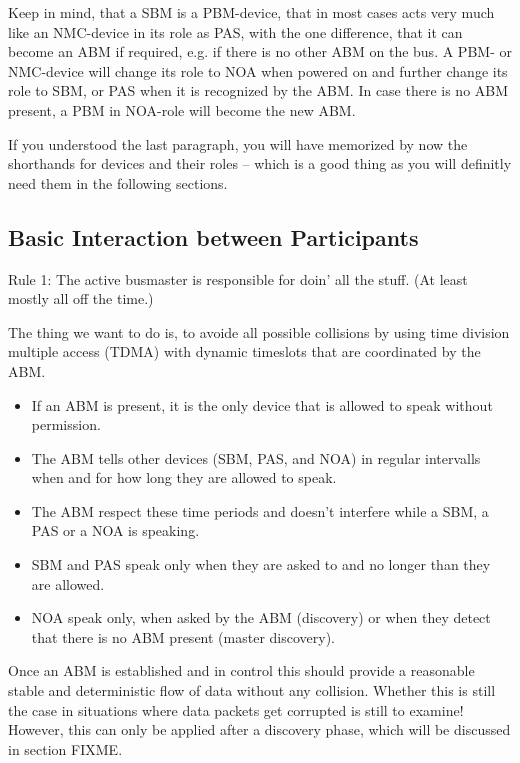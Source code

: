 \documentclass[a4paper,12pt]{scrartcl}
\begin{document}
Keep in mind, that a SBM is a PBM-device, that in most cases acts very much like an NMC-device in its role as PAS, with the one difference,
that it can become an ABM if required, e.g. if there is no other ABM on the bus.
A PBM- or NMC-device will change its role to NOA when powered on and further change its role to SBM, or PAS when it is recognized by the ABM.
In case there is no ABM present, a PBM in NOA-role will become the new ABM.

If you understood the last paragraph, you will have memorized by now the shorthands for devices and their roles -- which is a
good thing as you will definitly need them in the following sections.

\subsection{Basic Interaction between Participants}
Rule 1: The active busmaster is responsible for doin' all the stuff. (At least mostly all off the time.)

The thing we want to do is, to avoide all possible collisions by using time division multiple access
(TDMA) with dynamic timeslots that are coordinated by the ABM.

\begin{itemize}
\item If an ABM is present, it is the only device that is allowed to speak without permission.
\item The ABM tells other devices (SBM, PAS, and NOA) in regular intervalls when and for how long they are allowed to speak.
\item The ABM respect these time periods and doesn't interfere while a SBM, a PAS or a NOA is speaking.
\item SBM and PAS speak only when they are asked to and no longer than they are allowed.
\item NOA speak only, when asked by the ABM (discovery) or when they detect that there is no ABM present (master discovery).
\end{itemize}

Once an ABM is established and in control this should provide a reasonable stable and deterministic flow of data without any collision.
Whether this is still the case in situations where data packets get corrupted is still to examine!
However, this can only be applied after a discovery phase, which will be discussed in section FIXME.
\end{document}
